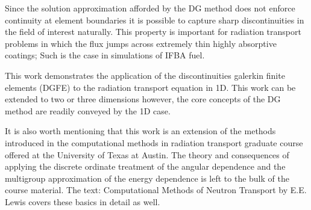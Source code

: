 Since the solution approximation afforded by the DG method does not enforce continuity at
element boundaries it is possible to capture sharp discontinuities in the field
of interest naturally.  This property is important for radiation transport problems
in which the flux jumps across extremely thin highly absorptive coatings;
Such is the case in simulations of IFBA fuel.

This work demonstrates the application of the discontinuities galerkin finite elements (DGFE)
to the radiation transport equation in 1D.  This work can be extended to two or
three dimensions however, the core concepts of the DG method are readily conveyed by the 1D case.

It is also worth mentioning that this work is an extension of the methods introduced in
the computational methods in radiation transport graduate course offered at the University
of Texas at Austin.  The theory and consequences of applying the discrete ordinate treatment of the angular
dependence and the multigroup approximation of the energy dependence is left to the
bulk of the course material.
The text: Computational Methods of Neutron Transport by E.E. Lewis \cite{Lewis}
covers these basics in detail as well.
